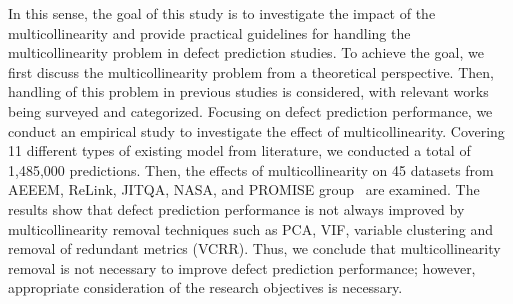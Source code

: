 In this sense, the goal of this study is to investigate the impact of the multicollinearity and provide practical guidelines for handling the multicollinearity problem in defect prediction studies. 
To achieve the goal, we first discuss the multicollinearity problem from a theoretical perspective. 
Then, handling of this problem in previous studies is considered, with relevant works being surveyed and categorized.
Focusing on defect prediction performance, we conduct an empirical study to investigate the effect of multicollinearity. Covering 11 different types of existing model from literature, we conducted a total of 1,485,000 predictions.
Then, the effects of multicollinearity on 45 datasets from AEEEM, ReLink, JIT\textunderscore QA, NASA, and PROMISE group~\cite{DAmbros2012EMSEbenchmark, Wu2011FSEReLink, Kamei2013TSEjit, ghotra2017msr} are examined. The results show that defect prediction performance is not always improved by multicollinearity removal techniques such as PCA, VIF, variable clustering and removal of redundant metrics (VCRR). 
Thus, we conclude that multicollinearity removal is not necessary to improve defect prediction performance; however, appropriate consideration of the research objectives is necessary. 
